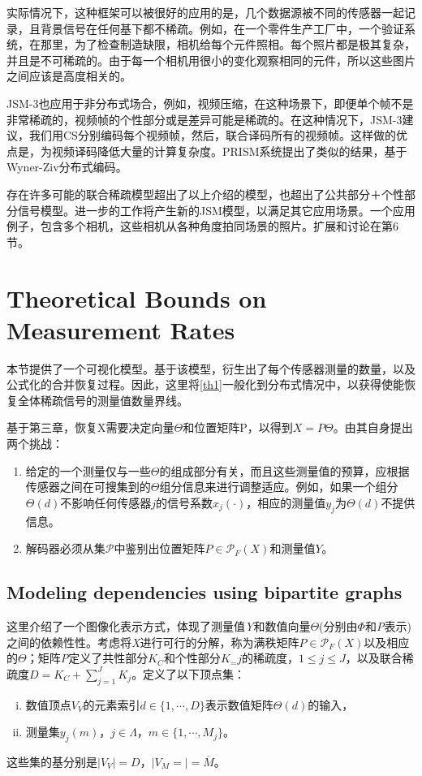 \documentclass[UTF8]{ctexart}
\theoremstyle{plain}
\theoremstyle{definition}
\theoremstyle{remark}
\newcommand{\upcite}[1]{\textsuperscript{\textsuperscript{\cite{#1}}}}
\begin{document}
	实际情况下，这种框架可以被很好的应用的是，几个数据源被不同的传感器一起记录，且背景信号在任何基下都不稀疏。例如，在一个零件生产工厂中，一个验证系统，在那里，为了检查制造缺限，相机给每个元件照相。每个照片都是极其复杂，并且是不可稀疏的。由于每一个相机用很小的变化观察相同的元件，所以这些图片之间应该是高度相关的。
	
	JSM-3也应用于非分布式场合，例如，视频压缩，在这种场景下，即便单个帧不是非常稀疏的，视频帧的个性部分或是差异可能是稀疏的。在这种情况下，JSM-3建议，我们用CS分别编码每个视频帧，然后，联合译码所有的视频帧。这样做的优点是，为视频译码降低大量的计算复杂度。PRISM系统提出了类似的结果，基于Wyner-Ziv分布式编码\upcite{Puri2002}。
	
	存在许多可能的联合稀疏模型超出了以上介绍的模型，也超出了公共部分＋个性部分信号模型。进一步的工作将产生新的JSM模型，以满足其它应用场景。一个应用例子，包含多个相机，这些相机从各种角度拍同场景的照片\upcite{Wagner2000}。扩展和讨论在第6节。
	
	\section{Theoretical Bounds on Measurement Rates}
	本节提供了一个可视化模型。基于该模型，衍生出了每个传感器测量的数量，以及公式化的合并恢复过程。因此，这里将\cref{th1}一般化到分布式情况中，以获得使能恢复全体稀疏信号的测量值数量界线。
	
	基于第三章，恢复X需要决定向量$\Theta$和位置矩阵P，以得到$X=P\Theta$。由其自身提出两个挑战：
	\begin{enumerate}
		\item 给定的一个测量仅与一些$\Theta$的组成部分有关，而且这些测量值的预算，应根据传感器之间在可搜集到的$\Theta$组分信息来进行调整适应。例如，如果一个组分$\Theta(d)$不影响任何传感器$j$的信号系数$x_j(\cdot)$，相应的测量值$y_j$为$\Theta(d)$不提供信息。
		\item 解码器必须从集$\mathcal{P}$中鉴别出位置矩阵$P \in \mathcal{P}_F(X)$和测量值$Y$。
	\end{enumerate}
	
	\subsection{Modeling dependencies using bipartite graphs}
	这里介绍了一个图像化表示方式，体现了测量值\emph{Y}和数值向量$\Theta$(分别由$\Phi$和\emph{P}表示)之间的依赖性性。考虑将\emph{X}进行可行的分解，称为满秩矩阵$P\in\mathcal{P}_F(X)$以及相应的$\Theta$；矩阵\emph{P}定义了共性部分$K_C$和个性部分$K_=j$的稀疏度，$1\leq j \leq J$，以及联合稀疏度$D=K_C+\sum\limits_{j=1}^{J}K_j$。定义了以下顶点集：
	\begin{enumerate}[(i)]
		\item 数值顶点$V_V$的元素索引$d\in\{1,\cdots,D\}$表示数值矩阵$\Theta(d)$的输入，
		\item 测量集$y_j(m)$，$j\in\Lambda$，$m\in\{1,\cdots,M_j\}$。
	\end{enumerate}
	这些集的基分别是$\left|V_V\right|=D$，$\left|V_M=\right|=\overline{M}$。
	
\end{document}
